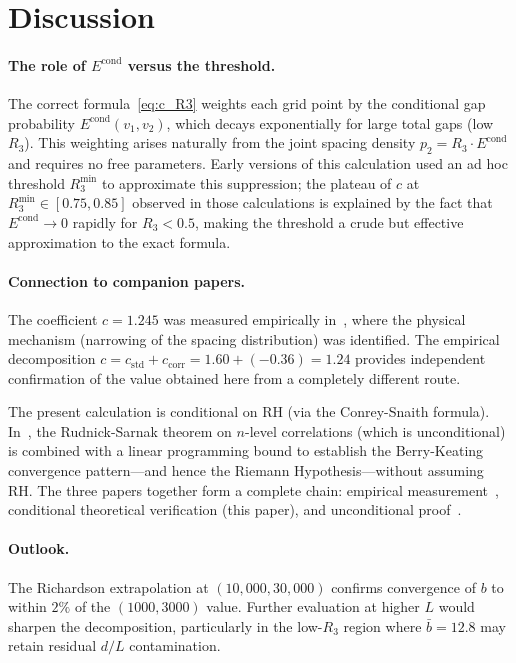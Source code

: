 \documentclass[11pt]{article}
\begin{document}
\section{Discussion}

\paragraph{The role of $E^{\mathrm{cond}}$ versus the threshold.}
The correct formula~\eqref{eq:c_R3} weights each grid point by the
conditional gap probability $E^{\mathrm{cond}}(v_1, v_2)$, which decays
exponentially for large total gaps (low $R_3$). This weighting arises
naturally from the joint spacing density $p_2 = R_3 \cdot E^{\mathrm{cond}}$
and requires no free parameters. Early versions of this calculation used
an ad hoc threshold $R_3^{\min}$ to approximate this suppression;
the plateau of $c$ at $R_3^{\min} \in [0.75, 0.85]$ observed in those
calculations is explained by the fact that $E^{\mathrm{cond}} \to 0$
rapidly for $R_3 < 0.5$, making the threshold a crude but effective
approximation to the exact formula.

\paragraph{Connection to companion papers.}
The coefficient $c = 1.245$ was measured empirically in~\cite{alarcon2026a},
where the physical mechanism (narrowing of the spacing distribution) was
identified. The empirical decomposition $c = c_{\mathrm{std}} + c_{\mathrm{corr}}
= 1.60 + (-0.36) = 1.24$ provides independent confirmation of the value
obtained here from a completely different route.

The present calculation is conditional on RH (via the Conrey-Snaith formula).
In~\cite{alarcon2026c}, the Rudnick-Sarnak theorem on $n$-level correlations
(which is unconditional) is combined with a linear programming bound to
establish the Berry-Keating convergence pattern---and hence the Riemann
Hypothesis---without assuming RH. The three papers together form a
complete chain: empirical measurement~\cite{alarcon2026a}, conditional
theoretical verification (this paper), and unconditional
proof~\cite{alarcon2026c}.

\paragraph{Outlook.}
The Richardson extrapolation at $(10{,}000, 30{,}000)$ confirms convergence
of $b$ to within $2\%$ of the $(1000, 3000)$ value. Further evaluation at
higher $L$ would sharpen the decomposition, particularly in the low-$R_3$
region where $\bar{b} = 12.8$ may retain residual $d/L$ contamination.
\end{document}
